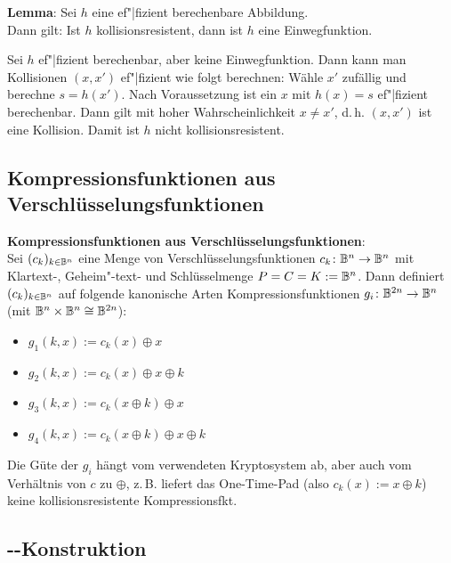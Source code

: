 \textbf{Lemma}:
Sei $h$ eine ef"|fizient berechenbare Abbildung.\\
Dann gilt: Ist $h$ kollisionsresistent, dann ist $h$ eine Einwegfunktion.

\begin{Beweis}
    Sei $h$ ef"|fizient berechenbar, aber keine Einwegfunktion.
    Dann kann man Kollisionen $(x, x')$ ef"|fizient wie folgt berechnen:
    Wähle $x'$ zufällig und berechne $s = h(x')$.
    Nach Voraussetzung ist ein $x$ mit $h(x) = s$ ef"|fizient berechenbar.
    Dann gilt mit hoher Wahrscheinlichkeit $x \not= x'$,
    d.\,h. $(x, x')$ ist eine Kollision.
    Damit ist $h$ nicht kollisionsresistent.
\end{Beweis}

\subsection{%
    Kompressionsfunktionen aus Verschlüsselungsfunktionen%
}

\textbf{Kompressionsfunktionen aus Verschlüsselungsfunktionen}:\\
Sei $(c_k)_{k \in \mathbb{B}^n}$ eine Menge von Verschlüsselungsfunktionen $c_k\colon \mathbb{B}^n \to \mathbb{B}^n$
mit Klartext-, Geheim"-text- und Schlüsselmenge $P = C = K := \mathbb{B}^n$.
Dann definiert $(c_k)_{k \in \mathbb{B}^n}$ auf folgende kanonische Arten Kompressionsfunktionen
$g_i\colon \mathbb{B}^{2n} \to \mathbb{B}^n$ (mit $\mathbb{B}^n \times \mathbb{B}^n \cong \mathbb{B}^{2n}$):
\begin{itemize}
    \item
    $g_1(k, x) := c_k(x) \oplus x$

    \item
    $g_2(k, x) := c_k(x) \oplus x \oplus k$

    \item
    $g_3(k, x) := c_k(x \oplus k) \oplus x$

    \item
    $g_4(k, x) := c_k(x \oplus k) \oplus x \oplus k$
\end{itemize}
Die Güte der $g_i$ hängt vom verwendeten Kryptosystem ab,
aber auch vom Verhältnis von $c$ zu $\oplus$, z.\,B. liefert das One-Time-Pad
(also $c_k(x) := x \oplus k$) keine kollisionsresistente Kompressionsfkt.

\pagebreak

\subsection{%
    --Konstruktion%
}

